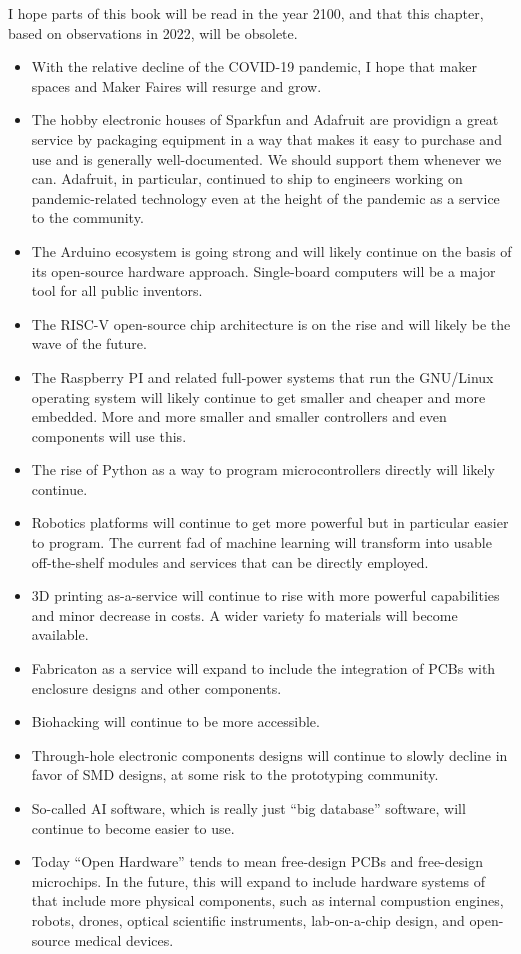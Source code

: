 \documentclass[
	fontsize=10pt, %
	twoside=false, %
	secnumdepth=1, %
]{kaobook}
\begin{document}
I hope parts of this book will be read in the year 2100, and that this chapter,
based on observations in 2022,
will be obsolete.
\begin{itemize}
\item With the relative decline of the COVID-19 pandemic, I hope
  that maker spaces and Maker Faires will resurge and grow.
\item The hobby electronic houses of Sparkfun and Adafruit are
  providign a great service by packaging equipment in a way that
  makes it easy to purchase and use and is generally well-documented.
  We should support them whenever we can. Adafruit, in particular, continued
  to ship to engineers working on pandemic-related technology even at the height
  of the pandemic as a service to the community.
\item The Arduino ecosystem is going strong and will likely continue
  on the basis of its open-source hardware approach. Single-board computers
  will be a major tool for all public inventors.
\item The RISC-V open-source chip architecture is on the rise and will
  likely be the wave of the future.
\item The Raspberry PI and related full-power systems that run the GNU/Linux
  operating system will likely continue to get smaller and cheaper and more
  embedded. More and more smaller and smaller controllers and even components
  will use this.
\item The rise of Python as a way to program microcontrollers directly will
  likely continue.
\item Robotics platforms will continue to get more powerful but in particular
  easier to program. The current fad of machine learning will transform into
  usable off-the-shelf modules and services that can be directly employed.
\item 3D printing as-a-service will continue to rise with more powerful
  capabilities and minor decrease in costs. A wider variety fo materials
  will become available.
\item Fabricaton as a service will expand to include the integration
  of PCBs with enclosure designs and other components.
\item Biohacking will continue to be more accessible.
\item Through-hole electronic components designs will continue to slowly decline in favor
  of SMD designs, at some risk to the prototyping community.
\item So-called AI software, which is really just ``big database'' software,
  will continue to become easier to use.
\item Today ``Open Hardware'' tends to mean free-design PCBs and free-design
  microchips. In the future, this will expand to include hardware systems
  of that include more physical components, such as internal compustion engines,
  robots, drones, optical scientific instruments, lab-on-a-chip design, and
  open-source medical devices.
\end{itemize}
\end{document}
